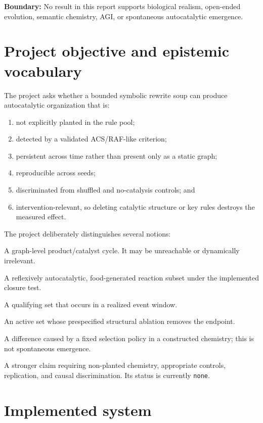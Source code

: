 \documentclass[11pt]{article}
\newcommand{\code}[1]{\texttt{#1}}
\newcommand{\bound}{\textbf{Boundary: }}
\begin{document}
\bound No result in this report supports biological realism, open-ended
evolution, semantic chemistry, AGI, or spontaneous autocatalytic emergence.

\section{Project objective and epistemic vocabulary}

The project asks whether a bounded symbolic rewrite soup can produce
autocatalytic organization that is:

\begin{enumerate}
\item not explicitly planted in the rule pool;
\item detected by a validated ACS/RAF-like criterion;
\item persistent across time rather than present only as a static graph;
\item reproducible across seeds;
\item discriminated from shuffled and no-catalysis controls; and
\item intervention-relevant, so deleting catalytic structure or key rules
      destroys the measured effect.
\end{enumerate}

The project deliberately distinguishes several notions:

\begin{description}[style=nextline]
\item[Static catalytic cycle] A graph-level product/catalyst cycle.  It may be
unreachable or dynamically irrelevant.
\item[RAF] A reflexively autocatalytic, food-generated reaction subset under
the implemented closure test.
\item[Active RAF/ACS] A qualifying set that occurs in a realized event window.
\item[Causal RAF/ACS] An active set whose prespecified structural ablation
removes the endpoint.
\item[Guided uplift] A difference caused by a fixed selection policy in a
constructed chemistry; this is not spontaneous emergence.
\item[Spontaneous emergence] A stronger claim requiring non-planted chemistry,
appropriate controls, replication, and causal discrimination.  Its status is
currently \code{none}.
\end{description}

\section{Implemented system}
\end{document}
